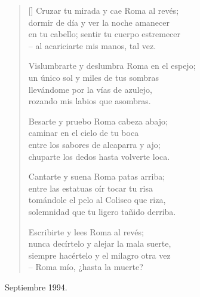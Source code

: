 \documentclass[a4paper,11pt]{article}
\begin{document}

\settowidth{\versewidth}{en tu cabello; sentir tu cuerpo estremecer}

\bigskip

\begin{verse}[\versewidth]
  Cruzar tu mirada y cae Roma al revés; \\
  dormir de día y ver la noche amanecer \\
  en tu cabello; sentir tu cuerpo estremecer \\
  -- al acariciarte mis manos, tal vez.

  Vislumbrarte y deslumbra Roma en el espejo; \\
  un único sol y miles de tus sombras \\
  llevándome por la vías de azulejo, \\
  rozando mis labios que asombras.

  Besarte y pruebo Roma cabeza abajo; \\
  caminar en el cielo de tu boca \\
  entre los sabores de alcaparra y ajo; \\
  chuparte los dedos hasta volverte loca.

  Cantarte y suena Roma patas arriba; \\
  entre las estatuas oír tocar tu risa \\
  tomándole el pelo al Coliseo que riza, \\
  solemnidad que tu ligero tañido derriba.

  Escribirte y lees Roma al revés; \\
  nunca decírtelo y alejar la mala suerte, \\
  siempre hacértelo y el milagro otra vez \\
  -- Roma mío, ¿hasta la muerte?
\end{verse}

\bigskip \bigskip \qquad Septiembre 1994.
\end{document}
